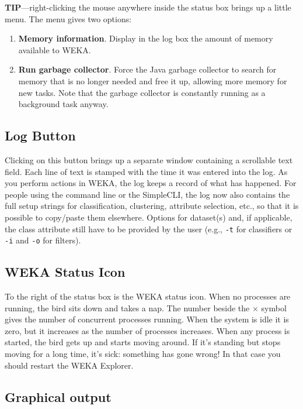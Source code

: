 \documentclass[a4paper]{article}
\begin{document}
\textbf{TIP}---right-clicking the mouse anywhere inside the status box brings
up a little menu. The menu gives two options: 

\begin{enumerate}
\item \textbf{Memory information}.
Display in the log box the amount of memory available to WEKA.
\item \textbf{Run garbage collector}.
Force the Java garbage collector to search for memory that is no longer needed
and free it up, allowing more memory for new tasks. Note that the garbage
collector is constantly running as a background task anyway.
\end{enumerate}

\subsection{Log Button}

Clicking on this button brings up a separate window containing a scrollable text
field. Each line of text is stamped with the time it was entered into the
log. As you perform actions in WEKA, the log keeps a record of what has
happened. For people using the command line or the SimpleCLI, the log now also 
contains the full setup strings for classification, clustering, attribute selection, 
etc., so that it is possible to copy/paste them elsewhere. 
Options for dataset(s) and, if applicable, the class attribute still have to 
be provided by the user (e.g., \texttt{-t} for classifiers or \texttt{-i} 
and \texttt{-o} for filters).

\subsection{WEKA Status Icon}

To the right of the status box is the WEKA status icon. When no processes are
running, the bird sits down and takes a nap. The number beside the $\times$
symbol gives the number of concurrent processes running.  When the system is
idle it is zero, but it increases as the number of processes increases.
When any process is started, the bird gets up and starts moving around. If
it's standing but stops moving for a long time, it's sick: something has gone
wrong!  In that case you should restart the WEKA Explorer.

\subsection{Graphical output}
\end{document}
